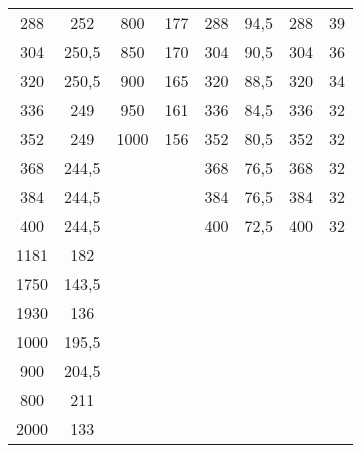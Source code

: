 \documentclass[
  bibliography=totoc,     %
  captions=tableheading,  %
  titlepage=firstiscover, %
]{scrartcl}
\begin{document}
\begin{table}
\begin{tabular}{c c c c c c c c}
    288   & 252   & 800  & 177   & 288  & 94,5  & 288  & 39    \\
    304   & 250,5 & 850  & 170   & 304  & 90,5  & 304  & 36    \\
    320   & 250,5 & 900  & 165   & 320  & 88,5  & 320  & 34    \\
    336   & 249   & 950  & 161   & 336  & 84,5  & 336  & 32    \\
    352   & 249   & 1000 & 156   & 352  & 80,5  & 352  & 32    \\
    368   & 244,5 &      &       & 368  & 76,5  & 368  & 32    \\
    384   & 244,5 &      &       & 384  & 76,5  & 384  & 32    \\
    400   & 244,5 &      &       & 400  & 72,5  & 400  & 32    \\
    1181  & 182   &      &       &      &       &      &       \\
    1750  & 143,5 &      &       &      &       &      &       \\
    1930  & 136   &      &       &      &       &      &       \\
    1000  & 195,5 &      &       &      &       &      &       \\
    900   & 204,5 &      &       &      &       &      &       \\
    800   & 211   &      &       &      &       &      &       \\
    2000  & 133   &      &       &      &       &      &       \\
    \bottomrule
  \end{tabular}
\end{table}
\end{document}
